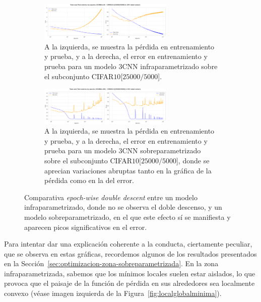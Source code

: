 \begin{figure}[h]
    \centering
    \begin{subfigure}[b]{\textwidth}
        \centering
        \includegraphics[width=0.7\textwidth]{img/experiments/epoch-wise3CNNunderparameterized.png}
        \caption{A la izquierda, se muestra la pérdida en entrenamiento y prueba, y a la derecha, el error en entrenamiento y prueba para un modelo $3$CNN infraparametrizado sobre el subconjunto CIFAR$10$[$25000/5000$].}\label{fig:epoch-wise3CNNunderparameterized}
    \end{subfigure}
    
    \vspace{1em} 

    \begin{subfigure}[b]{\textwidth}
        \centering
        \includegraphics[width=0.7\textwidth]{img/experiments/epoch-wise3CNNoverparameterized.png}
        \caption{A la izquierda, se muestra la pérdida en entrenamiento y prueba, y a la derecha, el error en entrenamiento y prueba para un modelo $3$CNN sobreparametrizado sobre el subconjunto CIFAR$10$[$25000/5000$], donde se aprecian variaciones abruptas tanto en la gráfica de la pérdida como en la del error.}\label{fig:epoch-wise3CNNoverparameterized}
    \end{subfigure}
    
    \caption[Comparativa \textit{epoch-wise double descent} entre un modelo infraparametrizado y uno sobreparametrizado en el que aparecen picos significativos en el error.]{Comparativa \textit{epoch-wise double descent} entre un modelo infraparametrizado, donde no se observa el doble descenso, y un modelo sobreparametrizado, en el que este efecto sí se manifiesta y aparecen picos significativos en el error.}\label{fig:epoch-wise-bruscos1}
\end{figure}

Para intentar dar una explicación coherente a la conducta, ciertamente peculiar, que se observa en estas gráficas, recordemos algunos de los resultados presentados en la Sección~\ref{sec:optimizacion-zona-sobreparametrizada}. En la zona infraparametrizada, sabemos que los mínimos locales suelen estar aislados, lo que provoca que el paisaje de la función de pérdida en sus alrededores sea localmente convexo (véase imagen izquierda de la Figura~\ref{fig:localglobalminima}).\newline

